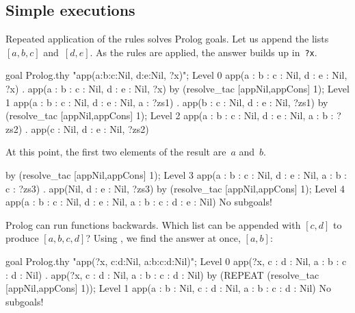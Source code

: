 \subsection{Simple executions}
Repeated application of the rules solves {\sc Prolog} goals.  Let us
append the lists $[a,b,c]$ and~$[d,e]$.  As the rules are applied, the
answer builds up in~{\tt ?x}.
\begin{ttbox}
goal Prolog.thy "app(a:b:c:Nil, d:e:Nil, ?x)";
{\out Level 0}
{\out app(a : b : c : Nil, d : e : Nil, ?x)}
{. app(a : b : c : Nil, d : e : Nil, ?x)}
\ttbreak
by (resolve_tac [appNil,appCons] 1);
{\out Level 1}
{\out app(a : b : c : Nil, d : e : Nil, a : ?zs1)}
{. app(b : c : Nil, d : e : Nil, ?zs1)}
\ttbreak
by (resolve_tac [appNil,appCons] 1);
{\out Level 2}
{\out app(a : b : c : Nil, d : e : Nil, a : b : ?zs2)}
{. app(c : Nil, d : e : Nil, ?zs2)}
\end{ttbox}
At this point, the first two elements of the result are~$a$ and~$b$.
\begin{ttbox}
by (resolve_tac [appNil,appCons] 1);
{\out Level 3}
{\out app(a : b : c : Nil, d : e : Nil, a : b : c : ?zs3)}
{. app(Nil, d : e : Nil, ?zs3)}
\ttbreak
by (resolve_tac [appNil,appCons] 1);
{\out Level 4}
{\out app(a : b : c : Nil, d : e : Nil, a : b : c : d : e : Nil)}
{\out No subgoals!}
\end{ttbox}

{\sc Prolog} can run functions backwards.  Which list can be appended
with $[c,d]$ to produce $[a,b,c,d]$?
Using , we find the answer at once, $[a,b]$:
\begin{ttbox}
goal Prolog.thy "app(?x, c:d:Nil, a:b:c:d:Nil)";
{\out Level 0}
{\out app(?x, c : d : Nil, a : b : c : d : Nil)}
{. app(?x, c : d : Nil, a : b : c : d : Nil)}
\ttbreak
by (REPEAT (resolve_tac [appNil,appCons] 1));
{\out Level 1}
{\out app(a : b : Nil, c : d : Nil, a : b : c : d : Nil)}
{\out No subgoals!}
\end{ttbox}


